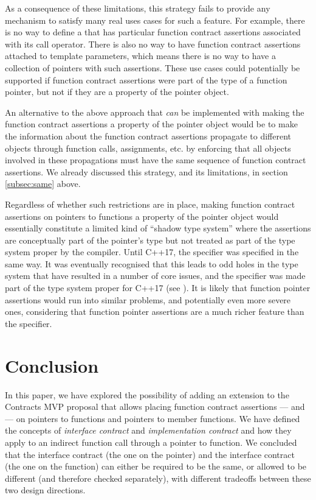 As a consequence of these limitations, this strategy fails to provide any mechanism to satisfy many real uses cases for such a feature. For example, there is no way to define a  that has particular function contract assertions associated with its call operator. There is also no way to have function contract assertions attached to template parameters, which means there is no way to have a collection of pointers with such assertions. These use cases could potentially be supported if function contract assertions were part of the type of a function pointer, but not if they are a property of the pointer object.

An alternative to the above approach that \emph{can} be implemented with making the function contract assertions a property of the pointer object would be to make the information about the function contract assertions propagate to different objects through function calls, assignments, etc. by enforcing that all objects involved in these propagations must have the same sequence of function contract assertions. We already discussed this strategy, and its limitations, in section \ref{subsec:same} above.

Regardless of whether such restrictions are in place, making function contract assertions on pointers to functions a property of the pointer object would essentially constitute a limited kind of ``shadow type system'' where the assertions are conceptually part of the pointer's type but not treated as part of the type system proper by the compiler. Until C++17, the  specifier was specified in the same way. It was eventually recognised that this leads to odd holes in the type system that have resulted in a number of core issues, and the  specifier was made part of the type system proper for C++17 (see \cite{P0012R1}). It is likely that function pointer assertions would run into similar problems, and potentially even more severe ones, considering that function pointer assertions are a much richer feature than the  specifier.

\section{Conclusion}

In this paper, we have explored the possibility of adding an extension to the Contracts MVP proposal \cite{P2900R7} that allows placing function contract assertions ---  and  --- on pointers to functions and pointers to member functions. We have defined the concepts of  \emph{interface contract} and  \emph{implementation contract} and how they apply to an indirect function call through a pointer to function. We concluded that the interface contract (the one on the pointer) and the interface contract (the one on the function) can either be required to be the same, or allowed to be different (and therefore checked separately), with different tradeoffs between these two design directions.

